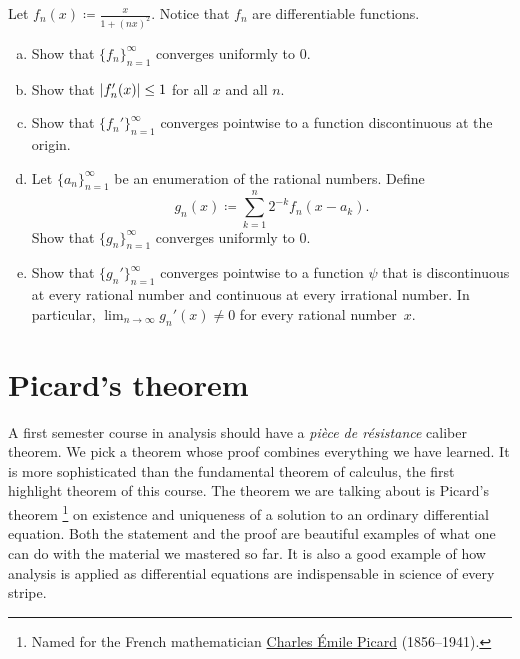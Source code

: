 \begin{exercise}
Let $f_n(x) \coloneqq \frac{x}{1+{(nx)}^2}$.  Notice that $f_n$ are differentiable
functions.
\begin{enumerate}[a)]
\item
Show that $\{ f_n \}_{n=1}^\infty$ converges uniformly to 0.
\item
Show that $\lvert {f_n'(x)} \rvert \leq 1$ for all $x$ and all $n$.
\item
Show that $\{ f_n' \}_{n=1}^\infty$ converges pointwise to a function discontinuous at
the origin.
\item
Let $\{ a_n \}_{n=1}^\infty$ be an enumeration of the rational numbers.
Define
\begin{equation*}
g_n(x) \coloneqq \sum_{k=1}^n 2^{-k} f_n(x-a_k) .
\end{equation*}
Show that $\{ g_n \}_{n=1}^\infty$ converges uniformly to 0.
\item
Show that $\{ g_n' \}_{n=1}^\infty$ converges pointwise to a function $\psi$ that
is discontinuous at every rational number and continuous at every
irrational number.  In particular, $\lim_{n\to\infty} g_n'(x) \not= 0$ for
every rational number~$x$.
\end{enumerate}
\end{exercise}


\sectionnewpage
\section{Picard's theorem}
\label{sec:picard}


A first semester course in analysis should have
a \emph{pi\`ece de r\'esistance} caliber
theorem.  We pick a theorem whose proof combines everything we have
learned.  It is more sophisticated than the fundamental theorem of calculus,
the first highlight theorem of this course.  The
theorem we are talking about is Picard's
theorem%
\footnote{Named for the French mathematician
\href{https://en.wikipedia.org/wiki/\%C3\%89mile_Picard}{Charles \'Emile Picard}
(1856--1941).}
on existence and uniqueness of a solution to an ordinary differential equation.
Both the statement and the proof are beautiful examples of what one can do
with the material we mastered so far.  It is also a good example of how analysis is
applied as differential equations are indispensable in science of every
stripe.

